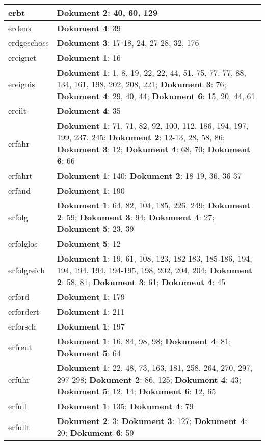 \documentclass[a5paper]{article}
\begin{document}
\begin{longtable}[l]{|l|p{3in}|}
\hline
erbt & \textbf{Dokument 2}: 40, 60, 129 \\
\hline
erdenk & \textbf{Dokument 4}: 39 \\
\hline
erdgeschoss & \textbf{Dokument 3}: 17-18, 24, 27-28, 32, 176 \\
\hline
ereignet & \textbf{Dokument 1}: 16 \\
\hline
ereignis & \textbf{Dokument 1}: 1, 8, 19, 22, 22, 44, 51, 75, 77, 77, 88, 134, 161, 198, 202, 208, 221; \textbf{Dokument 3}: 76; \textbf{Dokument 4}: 29, 40, 44; \textbf{Dokument 6}: 15, 20, 44, 61 \\
\hline
ereilt & \textbf{Dokument 4}: 35 \\
\hline
erfahr & \textbf{Dokument 1}: 71, 71, 82, 92, 100, 112, 186, 194, 197, 199, 237, 245; \textbf{Dokument 2}: 12-13, 28, 58, 86; \textbf{Dokument 3}: 12; \textbf{Dokument 4}: 68, 70; \textbf{Dokument 6}: 66 \\
\hline
erfahrt & \textbf{Dokument 1}: 140; \textbf{Dokument 2}: 18-19, 36, 36-37 \\
\hline
erfand & \textbf{Dokument 1}: 190 \\
\hline
erfolg & \textbf{Dokument 1}: 64, 82, 104, 185, 226, 249; \textbf{Dokument 2}: 59; \textbf{Dokument 3}: 94; \textbf{Dokument 4}: 27; \textbf{Dokument 5}: 23, 39 \\
\hline
erfolglos & \textbf{Dokument 5}: 12 \\
\hline
erfolgreich & \textbf{Dokument 1}: 19, 61, 108, 123, 182-183, 185-186, 194, 194, 194, 194, 194-195, 198, 202, 204, 204; \textbf{Dokument 2}: 58, 81; \textbf{Dokument 3}: 61; \textbf{Dokument 4}: 45 \\
\hline
erford & \textbf{Dokument 1}: 179 \\
\hline
erfordert & \textbf{Dokument 1}: 211 \\
\hline
erforsch & \textbf{Dokument 1}: 197 \\
\hline
erfreut & \textbf{Dokument 1}: 16, 84, 98, 98; \textbf{Dokument 4}: 81; \textbf{Dokument 5}: 64 \\
\hline
erfuhr & \textbf{Dokument 1}: 22, 48, 73, 163, 181, 258, 264, 270, 297, 297-298; \textbf{Dokument 2}: 86, 125; \textbf{Dokument 4}: 43; \textbf{Dokument 5}: 12, 14; \textbf{Dokument 6}: 12, 65 \\
\hline
erfull & \textbf{Dokument 1}: 135; \textbf{Dokument 4}: 79 \\
\hline
erfullt & \textbf{Dokument 2}: 3; \textbf{Dokument 3}: 127; \textbf{Dokument 4}: 20; \textbf{Dokument 6}: 59 \\

\end{longtable}
\end{document}
